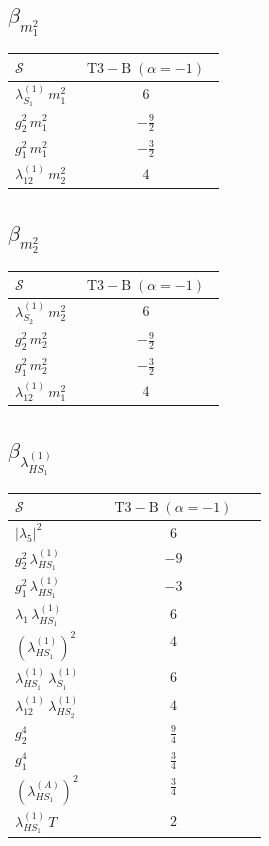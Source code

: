 \documentclass[9pt]{article}
\begin{document}
\subsection*{$ \beta_{m_1^{2}} $}
\begin{longtable}{@{}p{0.31\linewidth}c@{}}
\toprule
$\mathcal{S}$ & $ \mathrm{T3-B}\;(\alpha=-1) $ \\
\midrule
$ \lambda_{S_1}^{(1)}\,m_1^{2} $ & $ 6 $ \\
$ g_2^2\,m_1^{2} $ & $ - \frac{9}{2} $ \\
$ g_1^2\,m_1^{2} $ & $ - \frac{3}{2} $ \\
$ \lambda_{12}^{(1)}\,m_2^{2} $ & $ 4 $ \\
\bottomrule
\end{longtable}
\subsection*{$ \beta_{m_2^{2}} $}
\begin{longtable}{@{}p{0.31\linewidth}c@{}}
\toprule
$\mathcal{S}$ & $ \mathrm{T3-B}\;(\alpha=-1) $ \\
\midrule
$ \lambda_{S_2}^{(1)}\,m_2^{2} $ & $ 6 $ \\
$ g_2^2\,m_2^{2} $ & $ - \frac{9}{2} $ \\
$ g_1^2\,m_2^{2} $ & $ - \frac{3}{2} $ \\
$ \lambda_{12}^{(1)}\,m_1^{2} $ & $ 4 $ \\
\bottomrule
\end{longtable}
\subsection*{$ \beta_{\lambda_{HS_1}^{(1)}} $}
\begin{longtable}{@{}p{0.31\linewidth}c@{}}
\toprule
$\mathcal{S}$ & $ \mathrm{T3-B}\;(\alpha=-1) $ \\
\midrule
$ |\lambda_5|^2 $ & $ 6 $ \\
$ g_2^2\,\lambda_{HS_1}^{(1)} $ & $ -9 $ \\
$ g_1^2\,\lambda_{HS_1}^{(1)} $ & $ -3 $ \\
$ \lambda_1\,\lambda_{HS_1}^{(1)} $ & $ 6 $ \\
$ \left(\lambda_{HS_1}^{(1)}\right)^2 $ & $ 4 $ \\
$ \lambda_{HS_1}^{(1)}\,\lambda_{S_1}^{(1)} $ & $ 6 $ \\
$ \lambda_{12}^{(1)}\,\lambda_{HS_2}^{(1)} $ & $ 4 $ \\
$ g_2^4 $ & $ \frac{9}{4} $ \\
$ g_1^4 $ & $ \frac{3}{4} $ \\
$ \left(\lambda_{HS_1}^{(A)}\right)^2 $ & $ \frac{3}{4} $ \\
$ \lambda_{HS_1}^{(1)}\,T $ & $ 2 $ \\
\bottomrule
\end{longtable}
\end{document}
